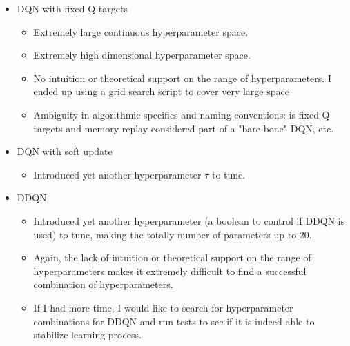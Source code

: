\documentclass[10pt]{article}
\begin{document}
   	\begin{itemize}
     		\item  DQN with fixed Q-targets
     			\begin{itemize}
					\item Extremely large continuous hyperparameter space.
       				\item Extremely high dimensional hyperparameter space.
					\item No intuition or theoretical support on the range of hyperparameters. I ended up using a grid search script to cover very large space
					\item Ambiguity in algorithmic specifics and naming conventions: is fixed Q targets and memory replay considered part of a "bare-bone" DQN, etc.
    			 \end{itemize}
		     \item  DQN with soft update
    			 \begin{itemize}
    				   \item Introduced yet another hyperparameter $\tau$ to tune.
				 \end{itemize}
			\item  DDQN
    			 \begin{itemize}
    				   \item Introduced yet another hyperparameter (a boolean to control if DDQN is used) to tune, making the totally number of parameters up to 20.
				       \item Again, the lack of intuition or theoretical support on the range of hyperparameters makes it extremely difficult to find a successful combination of hyperparameters.
				       \item If I had more time, I would like to search for hyperparameter combinations for DDQN and run tests to see if it is indeed able to stabilize learning process.
       				   
     			 \end{itemize}
	\end{itemize}









\end{document}
